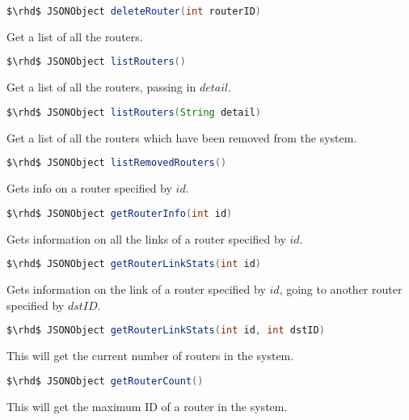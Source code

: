 \begin{lstlisting}[language=Java]
    $\rhd$ JSONObject deleteRouter(int routerID)
\end{lstlisting}

\noindent  Get a list of all the routers.

\begin{lstlisting}[language=Java]
    $\rhd$ JSONObject listRouters()
\end{lstlisting}

\noindent  Get a list of all the routers, passing in $detail$.

\begin{lstlisting}[language=Java]
    $\rhd$ JSONObject listRouters(String detail)
\end{lstlisting}

\noindent   Get a list of all the routers which have been removed from
the system.

\begin{lstlisting}[language=Java]
    $\rhd$ JSONObject listRemovedRouters()
\end{lstlisting}

\noindent  Gets info on a router specified by $id$.

\begin{lstlisting}[language=Java]
    $\rhd$ JSONObject getRouterInfo(int id)
\end{lstlisting}

\noindent Gets information on all the links of a router specified by $id$.

\begin{lstlisting}[language=Java]
    $\rhd$ JSONObject getRouterLinkStats(int id)
\end{lstlisting}

\noindent Gets information on the link of a router specified by $id$,
going to another router specified by $dstID$.

\begin{lstlisting}[language=Java]
    $\rhd$ JSONObject getRouterLinkStats(int id, int dstID)
\end{lstlisting}

\noindent  This will get the current number of routers in the system.

\begin{lstlisting}[language=Java]
    $\rhd$ JSONObject getRouterCount()
\end{lstlisting}

\noindent  This will get the maximum ID of a router in the system.


